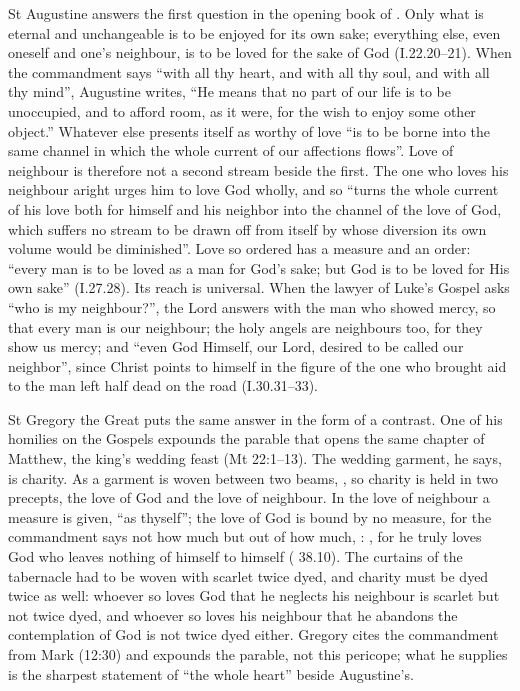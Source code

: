 St Augustine answers the first question in the opening book of . Only what is eternal and unchangeable is to be enjoyed
for its own sake; everything else, even oneself and one's neighbour, is to be
loved for the sake of God (I.22.20--21). When the commandment says ``with all
thy heart, and with all thy soul, and with all thy mind'', Augustine writes,
``He means that no part of our life is to be unoccupied, and to afford room, as
it were, for the wish to enjoy some other object.'' Whatever else presents
itself as worthy of love ``is to be borne into the same channel in which the
whole current of our affections flows''. Love of neighbour is therefore not a
second stream beside the first. The one who loves his neighbour aright urges
him to love God wholly, and so ``turns the whole current of his love both for
himself and his neighbor into the channel of the love of God, which suffers no
stream to be drawn off from itself by whose diversion its own volume would be
diminished''. Love so ordered has a measure and an order: ``every man is to be
loved as a man for God's sake; but God is to be loved for His own sake''
(I.27.28). Its reach is universal. When the lawyer of Luke's Gospel asks ``who
is my neighbour?'', the Lord answers with the man who showed mercy, so that
every man is our neighbour; the holy angels are neighbours too, for they show
us mercy; and ``even God Himself, our Lord, desired to be called our
neighbor'', since Christ points to himself in the figure of the one who
brought aid to the man left half dead on the road (I.30.31--33).

St Gregory the Great puts the same answer in the form of a contrast. One of
his homilies on the Gospels expounds the parable that opens the same chapter of
Matthew, the king's wedding feast (Mt 22:1--13).
The wedding garment, he says, is charity. As a garment is woven between two
beams, , so charity is held in two precepts, the
love of God and the love of neighbour. In the love of neighbour a measure is
given, ``as thyself''; the love of God is bound by no measure, for the
commandment says not how much but out of how much, : , for he truly loves
God who leaves nothing of himself to himself ( 38.10). The curtains of the tabernacle had to be woven with scarlet
twice dyed, and charity must be dyed twice as well: whoever so loves God that
he neglects his neighbour is scarlet but not twice dyed, and whoever so loves
his neighbour that he abandons the contemplation of God is not twice dyed
either. Gregory cites the commandment from Mark (12:30) and expounds the
parable, not this pericope; what he supplies is the sharpest statement of
``the whole heart'' beside Augustine's.

